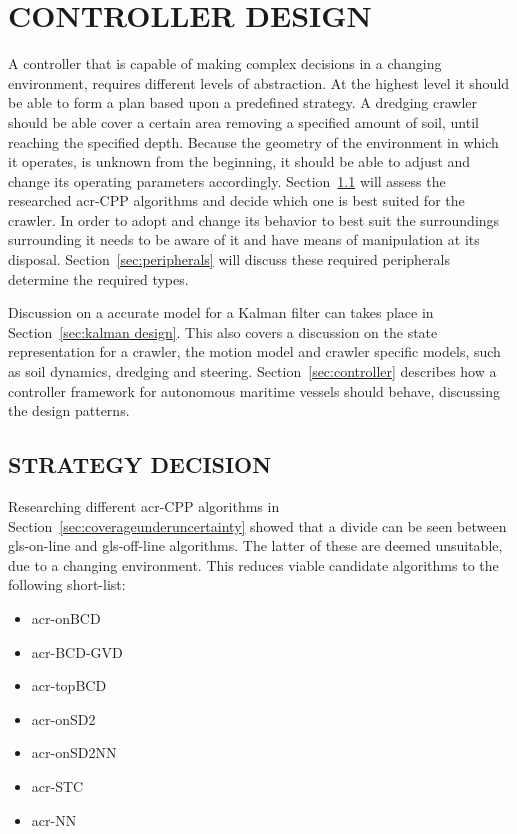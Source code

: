 

\chapter{CONTROLLER DESIGN}\label{chap:controller design}

A controller that is capable of making complex decisions in a changing environment, requires different levels of
abstraction. At the highest level it should be able to form a plan based upon a predefined strategy. A dredging crawler
should be able cover a certain area removing a specified amount of soil, until reaching the specified depth. Because the
geometry of the environment in which it operates, is unknown from the beginning, it should be able to adjust and change
its operating parameters accordingly. Section~\ref{sec:strategy decision} will assess the researched \gls{acr-CPP}
algorithms and decide which one is best suited for the crawler. In order to adopt and change its behavior to best suit
the surroundings surrounding it needs to be aware of it and have means of manipulation at its disposal.
Section~\ref{sec:peripherals} will discuss these required peripherals determine the required types.

Discussion on a accurate model for a Kalman filter can takes place in Section~\ref{sec:kalman design}. This also covers
a discussion on the state representation for a crawler, the motion model and crawler specific models, such as soil
dynamics, dredging and steering. Section~\ref{sec:controller} describes how a controller framework for autonomous
maritime vessels should behave, discussing the design patterns.


\section{STRATEGY DECISION}\label{sec:strategy decision}

Researching different \gls{acr-CPP} algorithms in Section~\ref{sec:coverageunderuncertainty} showed that a divide can be
seen between \gls{gls-on-line} and \gls{gls-off-line} algorithms. The latter of these are deemed unsuitable, due to a
changing environment. This reduces viable candidate algorithms to the following short-list:

\begin{itemize}
    \setlength\itemsep{0mm}
    \item \gls{acr-onBCD}
    \item \gls{acr-BCD-GVD}
    \item \gls{acr-topBCD}
    \item \gls{acr-onSD2}
    \item \gls{acr-onSD2NN}
    \item \gls{acr-STC}
    \item \gls{acr-NN}
\end{itemize}

